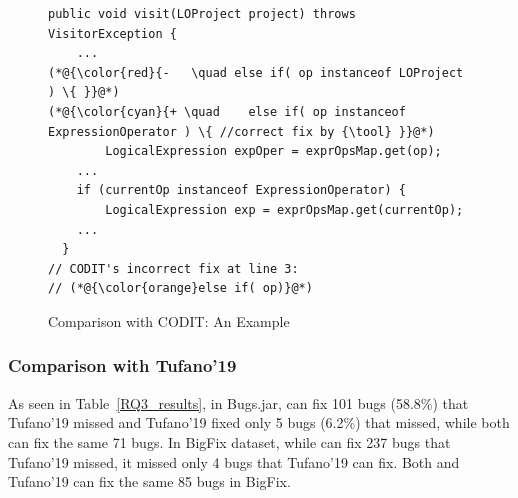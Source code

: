 
\begin{figure}[t]
	\centering
	\begin{lstlisting}[]
public void visit(LOProject project) throws VisitorException {
    ...
(*@{\color{red}{-	\quad else if( op instanceof LOProject ) \{ }}@*)
(*@{\color{cyan}{+ \quad	else if( op instanceof ExpressionOperator ) \{ //correct fix by {\tool} }}@*)
		LogicalExpression expOper = exprOpsMap.get(op);
	...
	if (currentOp instanceof ExpressionOperator) {
		LogicalExpression exp = exprOpsMap.get(currentOp);
	...
  }
// CODIT's incorrect fix at line 3:
// (*@{\color{orange}else if( op)}@*) 
	\end{lstlisting}
        \vspace{-17pt}
	\caption{Comparison with CODIT: An Example}
	\label{example_codit}
\end{figure}

\subsubsection{\bf Comparison with Tufano'19}





As seen in Table~\ref{RQ3_results}, in Bugs.jar, {\tool} can fix 101
bugs (58.8\%) that Tufano'19 missed and Tufano'19 fixed only 5 bugs
(6.2\%) that {\tool} missed, while both can fix the same 71 bugs.
In BigFix dataset, while {\tool} can fix 237 bugs that Tufano'19
missed, it missed only 4 bugs that Tufano'19 can fix. Both {\tool} and
Tufano'19 can fix the same 85 bugs in BigFix.

